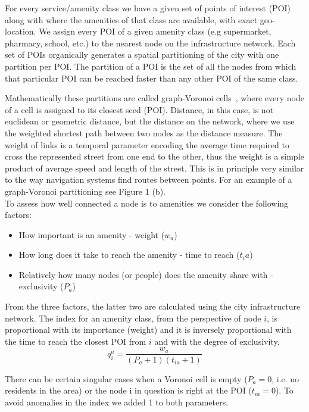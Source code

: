 For every service/amenity class we have a given set of points of interest (POI) along with where the amenities of that class are available, with exact geo-location. We assign every POI of a given amenity class (e.g supermarket, pharmacy, school, etc.) to the nearest node on the infrastructure network. Each set of POIs organically generates a spatial partitioning of the city with one partition per POI. The partition of a POI is the set of all the nodes from which that particular POI can be reached faster than any other POI of the same class.

Mathematically these partitions are called graph-Voronoi cells~\cite{Erwig2000Graph,Deritei2014Community}, where every node of a cell is assigned to its closest seed (POI). Distance, in this case, is not euclidean or geometric distance, but the distance on the network, where we use the weighted shortest path between two nodes as the distance measure. The weight of links is a temporal parameter encoding the average time required to cross the represented street from one end to the other, thus the weight is a simple product of average speed and length of the street. This is in principle very similar to the way navigation systems find routes between points. For an example of a graph-Voronoi partitioning see Figure 1 (b).\\
To assess how well connected a node is to amenities we consider the following factors:
\begin{itemize}
	\item How important is an amenity - weight ($w_a$)
	\item How long does it take to reach the amenity - time to reach ($t_ia$)
	\item Relatively how many nodes (or people) does the amenity share with - exclusivity ($P_a$)
\end{itemize}

From the three factors, the latter two are calculated using the city infrastructure network. The index for an amenity class, from the perspective of node $i$, is proportional with its importance (weight) and it is inversely proportional with the time to reach the closest POI from $i$ and with the degree of exclusivity.
\begin{equation}\label{q_i}
	q_i^a=\frac{w_{a}}{(P_a+1)(t_{ia}+1)}
\end{equation}

There can be certain singular cases when a Voronoi cell is empty ($P_a=0$, i.e. no residents in the area) or the node i in question is right at the POI ($t_{ia}=0$). To avoid anomalies in the index we added 1 to both parameters.

